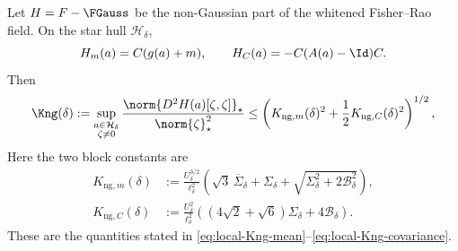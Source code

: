 \begin{lemma}
\label{lem:app-local-modulus-bound}
Let \(H=F-\FGauss\) be the non-Gaussian part of the whitened
Fisher--Rao field.  On the star hull \(\mathcal H_\delta\),
\[
  H_m(a)=C(g(a)+m),\qquad
  H_C(a)=-C(A(a)-\Id)C.
\]
Then
\begin{equation}
  \Kng(\delta)
  :=
  \sup_{\substack{a\in\mathcal H_\delta\\\zeta\neq0}}
  \frac{\norm{D^2H(a)[\zeta,\zeta]}_\star}
       {\norm{\zeta}_\star^2}
  \leq
  \left(
    K_{\mathrm{ng},m}(\delta)^2
    +\frac12K_{\mathrm{ng},C}(\delta)^2
  \right)^{1/2},
  \label{eq:app-local-modulus-pair}
\end{equation}
Here the two block constants are
\begin{align}
  K_{\mathrm{ng},m}(\delta)
  &:=
  \frac{U_\delta^{3/2}}{\ell_\delta^2}
  \left(
    \sqrt3\,\overline\Sigma_\delta+\Sigma_\delta
    +\sqrt{\Sigma_\delta^2+2\mathcal B_\delta^2}
  \right),
  \label{eq:app-local-Kng-mean}\\
  K_{\mathrm{ng},C}(\delta)
  &:=
  \frac{U_\delta^2}{\ell_\delta^2}
  \left(
    (4\sqrt2+\sqrt6)\Sigma_\delta+4\mathcal B_\delta
  \right).
  \label{eq:app-local-Kng-covariance}
\end{align}
These are the quantities stated in
\eqref{eq:local-Kng-mean}--\eqref{eq:local-Kng-covariance}.
\end{lemma}

